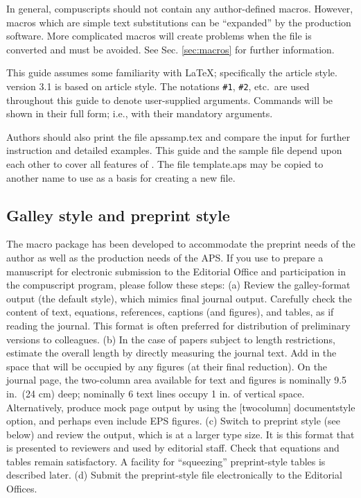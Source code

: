 In general, compuscripts should not contain any author-defined macros.
However, macros which are simple text substitutions can be
``expanded'' by the production software. More complicated macros
will create problems when the file is converted and must
be avoided. See Sec. \ref{sec:macros} for further information.

This guide assumes some familiarity with \LaTeX; specifically the article
style. \REVTeX{} version 3.1 is based on article style. The notations
\verb+#1+, \verb+#2+, etc.\ are used throughout this guide to denote
user-supplied arguments. Commands will be shown in their full form; i.e.,
with their mandatory arguments.

Authors should also print the file apssamp.tex and compare the input for
further instruction and detailed examples. This guide and the sample file
depend upon each other to cover all features of \REVTeX. The file
template.aps may be copied to another name to use as a basis for creating a
new \REVTeX{} file.

\subsection{Galley style and preprint style}

The \REVTeX{} macro package has been developed to accommodate the preprint
needs of the author as well as the production needs of the APS. If you use
\REVTeX{} to prepare a manuscript for electronic submission to the Editorial Office
and participation in the compuscript program, please follow these
steps: (a) Review the galley-format output (the default style),
which mimics final journal output. Carefully check the content of
text, equations, references, captions (and figures), and tables, as if
reading the journal. This format is often preferred for distribution
of preliminary versions to colleagues. (b) In the case of papers subject to
length restrictions, estimate the overall length by directly measuring the
journal text. Add in the space that will be occupied by any figures (at
their final reduction). On the journal page, the two-column area available
for text and figures is nominally 9.5 in.\ (24 cm) deep; nominally 6
text lines occupy 1 in. of vertical space. Alternatively, produce mock
page output by using the [twocolumn] documentstyle option, and perhaps
even include EPS figures. (c) Switch to
preprint style (see below) and review the output, which is at a larger type
size. It is this format that is presented to reviewers and used by
editorial staff. Check that equations and tables remain satisfactory. A \REVTeX{}
facility for ``squeezing'' preprint-style tables is described later. (d)
Submit the preprint-style file electronically to the Editorial Offices.

